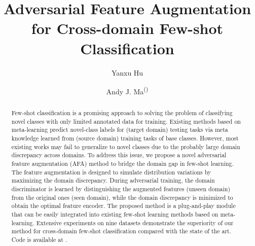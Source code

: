 \documentclass[runningheads]{utils/llncs}
\begin{document}
\pagestyle{headings}
\mainmatter
\def\ECCVSubNumber{100}  

\title{Adversarial Feature Augmentation for Cross-domain Few-shot Classification} 

\begin{comment}
\titlerunning{ECCV-22 submission ID \ECCVSubNumber} 
\authorrunning{ECCV-22 submission ID \ECCVSubNumber} 
\author{Anonymous ECCV submission}
\institute{Paper ID \ECCVSubNumber}
\end{comment}


\author{Yanxu Hu \and
Andy J. Ma\textsuperscript{(\Letter)}
}


\maketitle

\begin{abstract}
Few-shot classification is a promising approach to solving the problem of classifying novel classes with only limited annotated data for training. 
Existing methods based on meta-learning predict novel-class labels for (target domain) testing tasks via meta knowledge learned from (source domain) training tasks of base classes.
However, most existing works may fail to generalize to novel classes due to the probably large domain discrepancy across domains.
To address this issue, we propose a novel adversarial feature augmentation (AFA) method to bridge the domain gap in few-shot learning.
The feature augmentation is designed to simulate distribution variations by maximizing the domain discrepancy.
During adversarial training, the domain discriminator is learned by distinguishing the augmented features (unseen domain) from the original ones (seen domain), while the domain discrepancy is minimized to obtain the optimal feature encoder.
The proposed method is a plug-and-play module that can be easily integrated into existing few-shot learning methods based on meta-learning.
Extensive experiments on nine datasets demonstrate the superiority of our method for cross-domain few-shot classification compared with the state of the art.
Code is available at \href{https://github.com/youthhoo/AFA_For_Few_shot_learning}{}.
\end{abstract} 
\end{document}
